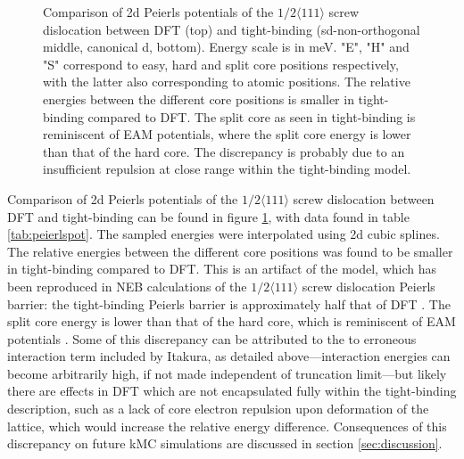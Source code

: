 \documentclass[a4paper,11pt]{article}
\begin{document}
\begin{figure}
\begin{tabular}{c}
    \end{tabular}		
\caption{Comparison of 2d Peierls potentials of the $1/2\langle 111\rangle$ screw dislocation between DFT \cite{Itakura2012} (top) and tight-binding (sd-non-orthogonal middle, canonical d, bottom). Energy scale is in meV. "E", "H" and "S" correspond to easy, hard and split core positions respectively, with the latter also corresponding to atomic positions. The relative energies between the different core positions is smaller in tight-binding compared to DFT. The split core as seen in tight-binding is reminiscent of EAM potentials, where the split core energy is lower than that of the hard core. The discrepancy is probably due to an insufficient repulsion at close range within the tight-binding model.}
	\label{fig:peierlspot}
    \end{figure}



Comparison of 2d Peierls potentials of the \(1/2\langle 111 \rangle\) screw dislocation
between DFT and tight-binding can be found in figure \ref{fig:peierlspot}, with data found in
table \ref{tab:peierlspot}. The sampled energies were interpolated using 2d cubic splines. The
relative energies between the different core positions was found to be smaller in
tight-binding compared to DFT. This is an artifact of the model, which has been reproduced
in NEB calculations of the \(1/2\langle 111\rangle\) screw dislocation Peierls barrier: the
tight-binding Peierls barrier is approximately half that of DFT \cite{Simpson2019}. The split
core energy is lower than that of the hard core, which is reminiscent of EAM potentials
\cite{Itakura2012}. Some of this discrepancy can be attributed to the to erroneous interaction
term included by Itakura, as detailed above---interaction energies can become arbitrarily
high, if not made independent of truncation limit---but likely there are effects in DFT
which are not encapsulated fully within the tight-binding description, such as a lack of
core electron repulsion upon deformation of the lattice, which would increase the relative
energy difference. Consequences of this discrepancy on future kMC simulations are discussed
in section \ref{sec:discussion}.
\end{document}
